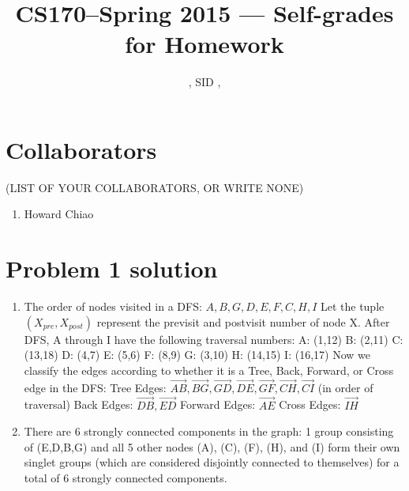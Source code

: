 \documentclass[11pt]{article}
\title{CS170--Spring 2015 --- Self-grades for Homework \Homework}
\author{\Name, SID \SID, \texttt{\Login}}
\date{}
\newenvironment{qparts}{\begin{enumerate}[{(}a{)}]}{\end{enumerate}}
\begin{document}
\maketitle

\section*{Collaborators} 
(LIST OF YOUR COLLABORATORS, OR WRITE NONE)

\begin{enumerate}
\item Howard Chiao
\end{enumerate}

\newpage
\section*{Problem 1 solution}

\begin{qparts}                                               
          
\item The order of nodes visited in a DFS: $A, B, G, D, E, F, C, H, I$\newline
Let the tuple $(X_{pre}, X_{post})$ represent the previsit and postvisit number of node X. After DFS, A through I have the following traversal numbers:\newline
A: (1,12)\newline
B: (2,11)\newline
C: (13,18)\newline
D: (4,7)\newline
E: (5,6)\newline
F: (8,9)\newline
G: (3,10)\newline
H: (14,15)\newline
I: (16,17)\newline
Now we classify the edges according to whether it is a Tree, Back, Forward, or Cross edge in the DFS:\newline
Tree Edges: $\vec{AB}, \vec{BG}, \vec{GD}, 
\vec{DE}, \vec{GF}, \vec{CH}, \vec{CI}$ (in order of traversal)\newline
Back Edges: $\vec{DB}, \vec{ED}$\newline
Forward Edges: $\vec{AE}$\newline
Cross Edges: $\vec{IH}$\newline
\item There are 6 strongly connected components in the graph:
1 group consisting of (E,D,B,G) and all 5 other nodes (A), (C), (F), (H), and (I) form their own singlet groups (which are considered disjointly connected to themselves) for a total of 6 strongly connected components. 
\end{qparts}
\end{document}
